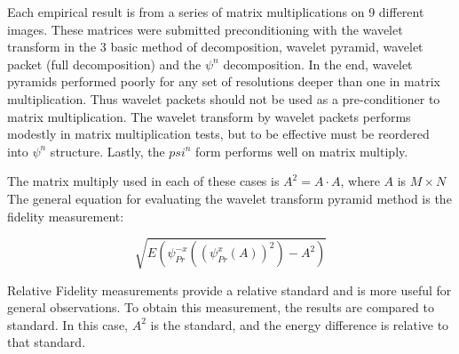 


%



Each empirical result is from %
a series of matrix multiplications on 9 different images.  These matrices were submitted preconditioning with the wavelet transform in the 3 basic method of decomposition, wavelet pyramid, wavelet packet (full decomposition) and the $\psi^n$ decomposition.%
In the end, wavelet pyramids performed poorly for any set of resolutions deeper than one in matrix multiplication.  Thus wavelet packets should not be used as a pre-conditioner to matrix multiplication.  The wavelet transform  by wavelet packets performs modestly in matrix multiplication tests, but to be effective must be reordered into $\psi^n$ structure. %
Lastly, the $psi^n$ form performs well on matrix multiply.   

The matrix multiply used in each of these cases is %
$A^2= A\cdot A$, where $A$ is $M\times N$ The general equation for evaluating the wavelet transform pyramid method is the fidelity measurement:

\[\sqrt{E(\psi_{Pr}^{-x} ( (\psi_{Pr}^x (A))^2) - A^2)} \]

Relative Fidelity measurements provide a relative standard and is more useful for general observations.  To obtain this measurement, the results are compared to standard.%
In this case, $A^2$ is the standard, and the energy difference is relative to that standard.  

